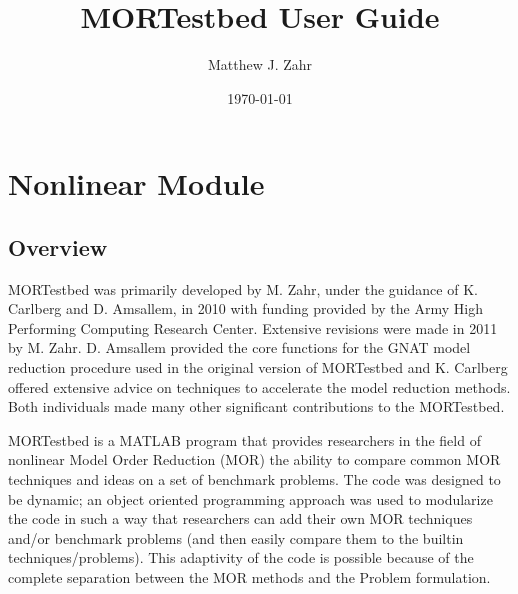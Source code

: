 \documentclass[notitlepage]{report}
\begin{document}
\author[1]{Matthew J. Zahr}
\title{MORTestbed User Guide}
\date{\today}


\maketitle

\tableofcontents

\part{Nonlinear Module}

\chapter{Overview}
MORTestbed was primarily developed by M. Zahr, under the guidance of K. Carlberg and D. Amsallem, in 2010 with funding provided by the Army High Performing Computing Research Center.  Extensive revisions were made in 2011 by M. Zahr.  D. Amsallem provided the core functions for the GNAT model reduction procedure used in the original version of MORTestbed and K. Carlberg offered extensive advice on techniques to accelerate the model reduction methods.  Both individuals made many other significant contributions to the MORTestbed.

MORTestbed is a MATLAB program that provides researchers in the field of nonlinear Model Order Reduction (MOR) the ability to compare common MOR techniques and ideas on a set of benchmark problems.  The code was designed to be dynamic; an object oriented programming approach was used to modularize the code in such a way that researchers can add their own MOR techniques and/or benchmark problems (and then easily compare them to the builtin techniques/problems).  This adaptivity of the code is possible because of the complete separation between the MOR methods and the Problem formulation.
\end{document}
